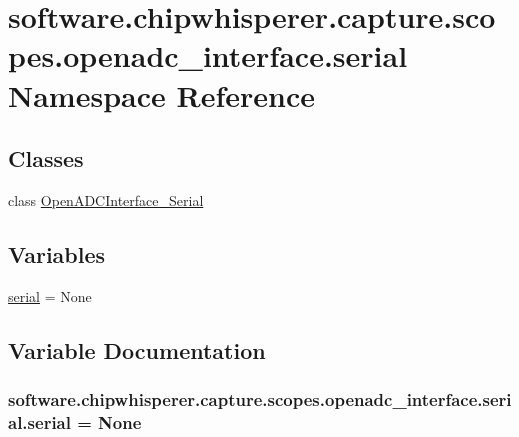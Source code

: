 \hypertarget{namespacesoftware_1_1chipwhisperer_1_1capture_1_1scopes_1_1openadc__interface_1_1serial}{}\section{software.\+chipwhisperer.\+capture.\+scopes.\+openadc\+\_\+interface.\+serial Namespace Reference}
\label{namespacesoftware_1_1chipwhisperer_1_1capture_1_1scopes_1_1openadc__interface_1_1serial}
\subsection*{Classes}
\begin{DoxyCompactItemize}
\item 
class \hyperlink{classsoftware_1_1chipwhisperer_1_1capture_1_1scopes_1_1openadc__interface_1_1serial_1_1OpenADCInterface__Serial}{Open\+A\+D\+C\+Interface\+\_\+\+Serial}
\end{DoxyCompactItemize}
\subsection*{Variables}
\begin{DoxyCompactItemize}
\item 
\hyperlink{namespacesoftware_1_1chipwhisperer_1_1capture_1_1scopes_1_1openadc__interface_1_1serial_a947a1a19dcb0db8e9d07c0bf668ac6e9}{serial} = None
\end{DoxyCompactItemize}


\subsection{Variable Documentation}
\hypertarget{namespacesoftware_1_1chipwhisperer_1_1capture_1_1scopes_1_1openadc__interface_1_1serial_a947a1a19dcb0db8e9d07c0bf668ac6e9}{}
\subsubsection[{serial}]{\setlength{\rightskip}{0pt plus 5cm}software.\+chipwhisperer.\+capture.\+scopes.\+openadc\+\_\+interface.\+serial.\+serial = None}\label{namespacesoftware_1_1chipwhisperer_1_1capture_1_1scopes_1_1openadc__interface_1_1serial_a947a1a19dcb0db8e9d07c0bf668ac6e9}
